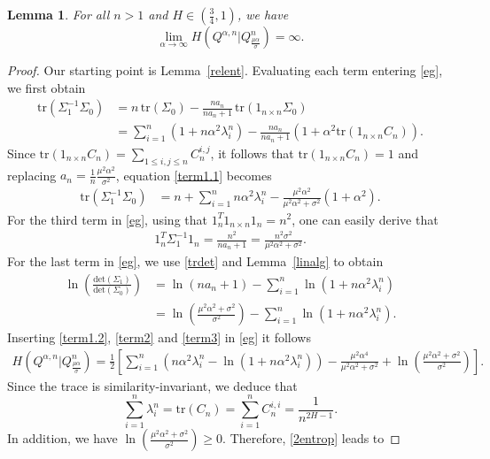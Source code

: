 \documentclass[reqno,a4paper]{amsart}
\theoremstyle{plain}
\theoremstyle{definition}
\theoremstyle{plain}
\newtheorem{lemma}{Lemma}
\theoremstyle{plain}
\theoremstyle{plain}
\begin{document}
\begin{lemma}\label{l1}
For all $n> 1$ and $H\in(\frac34,1)$, we have
$$\lim\limits_{\alpha\rightarrow\infty}H\left(Q^{\alpha,n}|Q_{\frac{\mu\alpha}{\sigma}}^n\right)=\infty.$$
\end{lemma}
\begin{proof}
Our starting point is Lemma~\ref{relent}. Evaluating each term entering \eqref{eg}, we first obtain
\begin{align}\label{term1.1}
 \text{tr}(\Sigma_1^{-1}\Sigma_0)&=n\,\text{tr}(\Sigma_0)-\frac{n a_n}{n a_n+1}\,\text{tr}(1_{n\times n}\Sigma_0)\nonumber\\
 &=\sum_{i=1}^n(1+n\alpha^2\lambda_i^n)-\frac{n a_n}{n a_n+1}(1+\alpha^2\text{tr}(1_{n\times n}C_n)).
\end{align}
Since $\text{tr}(1_{n\times n}C_n)=\sum_{1\leq i,j\leq n}C_n^{i,j}$, it follows that $\text{tr}(1_{n\times n}C_n)=1$ and replacing $a_n=\frac{1}{n}\frac{\mu^2\alpha^2}{\sigma^2}$, equation \eqref{term1.1} becomes
\begin{align}\label{term1.2}
 \text{tr}(\Sigma_1^{-1}\Sigma_0)&=n+\sum_{i=1}^nn\alpha^2\lambda_i^n-\frac{\mu^2\alpha^2}{\mu^2\alpha^2+\sigma^2}(1+\alpha^2).
\end{align}
For the third term in \eqref{eg}, using that $1_n^T1_{n\times n}1_n=n^2$, one can easily derive that
\begin{align}\label{term2}
 1_n^T\Sigma_1^{-1}1_n=\frac{n^2}{n a_n+1}=\frac{n^2\sigma^2}{\mu^2\alpha^2+\sigma^2}.
\end{align}
For the last term in \eqref{eg}, we use \eqref{trdet} and Lemma~\ref{linalg} to obtain
\begin{align}\label{term3}
 \ln\left(\frac{\textrm{det}\left(\Sigma_1\right)}{\textrm{det}\left(\Sigma_0\right)}\right)&=\ln(n a_n+1)-\sum_{i=1}^n\ln(1+n\alpha^2\lambda_i^n)\nonumber\\
 &=\ln\left(\frac{\mu^2\alpha^2+\sigma^2}{\sigma^2}\right)-\sum_{i=1}^n\ln(1+n\alpha^2\lambda_i^n).
\end{align}
Inserting \eqref{term1.2}, \eqref{term2} and \eqref{term3} in \eqref{eg} it follows
\begin{align}\label{2entrop}
 H\left(Q^{\alpha,n}|Q_{\frac{\mu\alpha}{\sigma}}^n\right)=\frac12\left[\sum\limits_{i=1}^n (n\alpha^2\lambda_i^n-\ln(1+n\alpha^2\lambda_i^n))-\frac{\mu^2\alpha^4}{\mu^2\alpha^2+\sigma^2}+\ln\left(\frac{\mu^2\alpha^2+\sigma^2}{\sigma^2}\right)\right].
\end{align}
Since the trace is similarity-invariant, we deduce that $$\sum_{i=1}^n\lambda_i^n=\textrm{tr}(C_n)=\sum_{i=1}^nC_n^{i,i}=\frac1{n^{2H-1}}.$$ In addition, we have  $\ln\left(\frac{\mu^2\alpha^2+\sigma^2}{\sigma^2}\right)\geq0$. Therefore, \eqref{2entrop} leads to

\end{proof}
\end{document}

